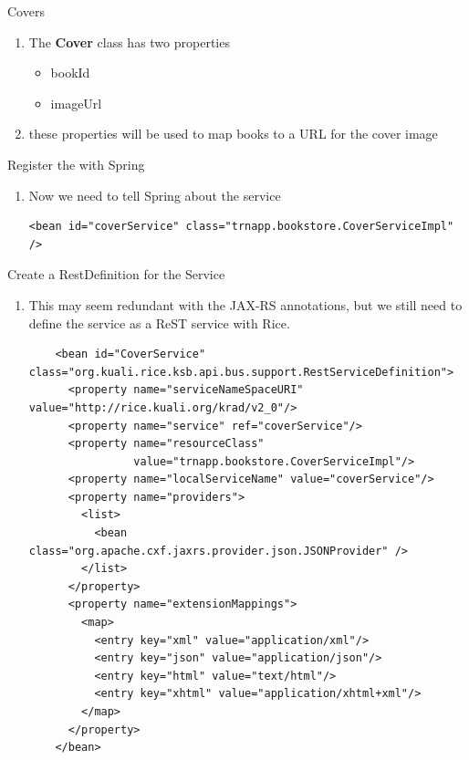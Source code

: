 \documentclass[xcolor=dvipsnames,14pt,professionalfonts]{beamer}
\begin{document}
\begin{frame}[fragile]{Covers}
  \begin{enumerate}
    \item The \textbf{Cover} class has two properties
      \begin{itemize}
        \item bookId
          \item imageUrl
        \end{itemize}
      \item these properties will be used to map books to a URL for
        the cover image
\end{enumerate}
\end{frame}


\begin{frame}[fragile]{Register the with Spring}
  \begin{enumerate}
    \item Now we need to tell Spring about the service
    \begin{verbatim}
<bean id="coverService" class="trnapp.bookstore.CoverServiceImpl" />
\end{verbatim} 
\end{enumerate}
\end{frame}
    
\begin{frame}[fragile]{Create a RestDefinition for the Service}
  \begin{enumerate}
    \item This may seem redundant with the JAX-RS annotations, but we
      still need to define the service as a ReST service with Rice.
    \begin{verbatim}
    <bean id="CoverService" class="org.kuali.rice.ksb.api.bus.support.RestServiceDefinition">
      <property name="serviceNameSpaceURI" value="http://rice.kuali.org/krad/v2_0"/>
      <property name="service" ref="coverService"/>
      <property name="resourceClass"
                value="trnapp.bookstore.CoverServiceImpl"/>
      <property name="localServiceName" value="coverService"/>
      <property name="providers">
        <list>
          <bean class="org.apache.cxf.jaxrs.provider.json.JSONProvider" /> 
        </list>
      </property>
      <property name="extensionMappings">
        <map>
          <entry key="xml" value="application/xml"/>
          <entry key="json" value="application/json"/>
          <entry key="html" value="text/html"/>
          <entry key="xhtml" value="application/xhtml+xml"/>
        </map>
      </property>
    </bean>
\end{verbatim} 
\end{enumerate}
\end{frame}
    
\end{document}
